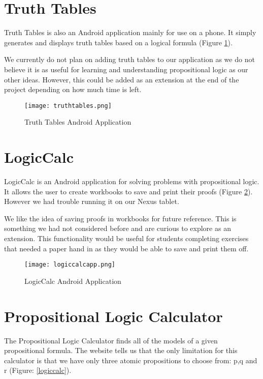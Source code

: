 \documentclass{report}
\begin{document}
\section{Truth Tables}

Truth Tables is also an Android application mainly for use on a phone. It simply generates and displays truth tables based on a logical formula (Figure \ref{truthtables}).

We currently do not plan on adding truth tables to our application as we do not believe it is as useful for learning and understanding propositional logic as our other ideas. However, this could be added as an extension at the end of the project depending on how much time is left.

\begin{figure}[ht]
    \centering
    \texttt{[image: truthtables.png]}
    \caption{Truth Tables Android Application}
    \label{truthtables}
\end{figure}

\section{LogicCalc}

LogicCalc is an Android application for solving problems with propositional logic. It allows the user to create workbooks to save and print their proofs (Figure \ref{logiccalcapp}). However we had trouble running it on our Nexus tablet.

We like the idea of saving proofs in workbooks for future reference. This is something we had not considered before and are curious to explore as an extension. This functionality would be useful for students completing exercises that needed a paper hand in as they would be able to save and print them off.

\begin{figure}[ht]
    \centering
    \texttt{[image: logiccalcapp.png]}
    \caption{LogicCalc Android Application}
    \label{logiccalcapp}
\end{figure}

\section{Propositional Logic Calculator}

The Propositional Logic Calculator\cite{logiccalc} finds all of the models of a given propositional formula. The website tells us that the only limitation for this calculator is that we have only three atomic propositions to choose from: p,q and r (Figure: \ref{logiccalc}).
\end{document}
